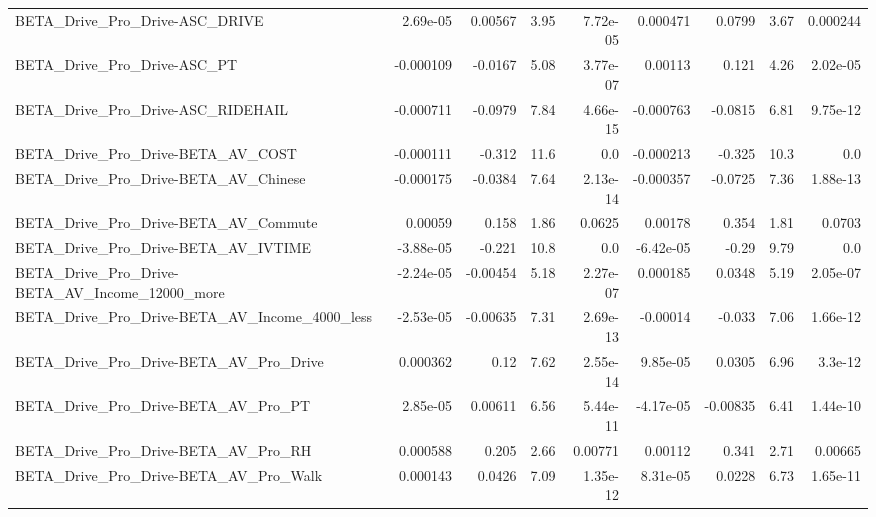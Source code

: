 \begin{tabular}{lrrrrrrrr}
BETA\_Drive\_Pro\_Drive-ASC\_DRIVE                     &    2.69e-05 &      0.00567 &      3.95 & 7.72e-05 &   0.000471 &      0.0799 &         3.67 &      0.000244 \\
BETA\_Drive\_Pro\_Drive-ASC\_PT                        &   -0.000109 &      -0.0167 &      5.08 & 3.77e-07 &    0.00113 &       0.121 &         4.26 &      2.02e-05 \\
BETA\_Drive\_Pro\_Drive-ASC\_RIDEHAIL                  &   -0.000711 &      -0.0979 &      7.84 & 4.66e-15 &  -0.000763 &     -0.0815 &         6.81 &      9.75e-12 \\
BETA\_Drive\_Pro\_Drive-BETA\_AV\_COST                  &   -0.000111 &       -0.312 &      11.6 &      0.0 &  -0.000213 &      -0.325 &         10.3 &           0.0 \\
BETA\_Drive\_Pro\_Drive-BETA\_AV\_Chinese               &   -0.000175 &      -0.0384 &      7.64 & 2.13e-14 &  -0.000357 &     -0.0725 &         7.36 &      1.88e-13 \\
BETA\_Drive\_Pro\_Drive-BETA\_AV\_Commute               &     0.00059 &        0.158 &      1.86 &   0.0625 &    0.00178 &       0.354 &         1.81 &        0.0703 \\
BETA\_Drive\_Pro\_Drive-BETA\_AV\_IVTIME                &   -3.88e-05 &       -0.221 &      10.8 &      0.0 &  -6.42e-05 &       -0.29 &         9.79 &           0.0 \\
BETA\_Drive\_Pro\_Drive-BETA\_AV\_Income\_12000\_more     &   -2.24e-05 &     -0.00454 &      5.18 & 2.27e-07 &   0.000185 &      0.0348 &         5.19 &      2.05e-07 \\
BETA\_Drive\_Pro\_Drive-BETA\_AV\_Income\_4000\_less      &   -2.53e-05 &     -0.00635 &      7.31 & 2.69e-13 &   -0.00014 &      -0.033 &         7.06 &      1.66e-12 \\
BETA\_Drive\_Pro\_Drive-BETA\_AV\_Pro\_Drive             &    0.000362 &         0.12 &      7.62 & 2.55e-14 &   9.85e-05 &      0.0305 &         6.96 &       3.3e-12 \\
BETA\_Drive\_Pro\_Drive-BETA\_AV\_Pro\_PT                &    2.85e-05 &      0.00611 &      6.56 & 5.44e-11 &  -4.17e-05 &    -0.00835 &         6.41 &      1.44e-10 \\
BETA\_Drive\_Pro\_Drive-BETA\_AV\_Pro\_RH                &    0.000588 &        0.205 &      2.66 &  0.00771 &    0.00112 &       0.341 &         2.71 &       0.00665 \\
BETA\_Drive\_Pro\_Drive-BETA\_AV\_Pro\_Walk              &    0.000143 &       0.0426 &      7.09 & 1.35e-12 &   8.31e-05 &      0.0228 &         6.73 &      1.65e-11 \\

\end{tabular}
